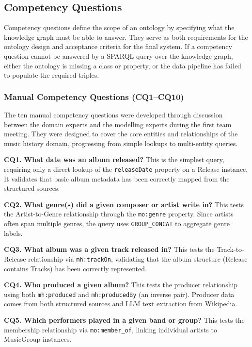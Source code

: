 \documentclass[11pt,a4paper]{article}
\begin{document}
\subsection{Competency Questions}

Competency questions define the scope of an ontology by specifying what the knowledge graph must be able to answer. They serve as both requirements for the ontology design and acceptance criteria for the final system. If a competency question cannot be answered by a SPARQL query over the knowledge graph, either the ontology is missing a class or property, or the data pipeline has failed to populate the required triples.

\subsubsection{Manual Competency Questions (CQ1--CQ10)}

The ten manual competency questions were developed through discussion between the domain experts and the modelling experts during the first team meeting. They were designed to cover the core entities and relationships of the music history domain, progressing from simple lookups to multi-entity queries.

\textbf{CQ1. What date was an album released?} This is the simplest query, requiring only a direct lookup of the \texttt{releaseDate} property on a Release instance. It validates that basic album metadata has been correctly mapped from the structured sources.

\textbf{CQ2. What genre(s) did a given composer or artist write in?} This tests the Artist-to-Genre relationship through the \texttt{mo:genre} property. Since artists often span multiple genres, the query uses \texttt{GROUP\_CONCAT} to aggregate genre labels.

\textbf{CQ3. What album was a given track released in?} This tests the Track-to-Release relationship via \texttt{mh:trackOn}, validating that the album structure (Release contains Tracks) has been correctly represented.

\textbf{CQ4. Who produced a given album?} This tests the producer relationship using both \texttt{mh:produced} and \texttt{mh:producedBy} (an inverse pair). Producer data comes from both structured sources and LLM text extraction from Wikipedia.

\textbf{CQ5. Which performers played in a given band or group?} This tests the membership relationship via \texttt{mo:member\_of}, linking individual artists to MusicGroup instances.
\end{document}
